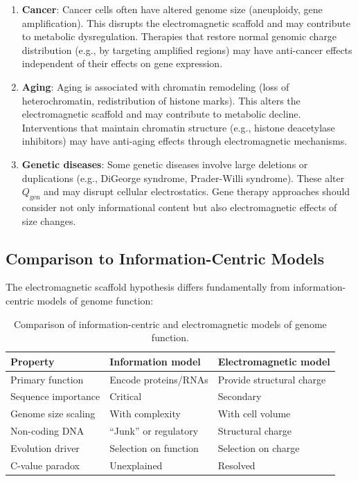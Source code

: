 \documentclass[twocolumn,10pt,aps,prd,superscriptaddress,floatfix,nofootinbib]{revtex4-2}
\theoremstyle{remark}
\begin{document}
\begin{enumerate}
\item \textbf{Cancer}: Cancer cells often have altered genome size (aneuploidy, gene amplification). This disrupts the electromagnetic scaffold and may contribute to metabolic dysregulation. Therapies that restore normal genomic charge distribution (e.g., by targeting amplified regions) may have anti-cancer effects independent of their effects on gene expression.

\item \textbf{Aging}: Aging is associated with chromatin remodeling (loss of heterochromatin, redistribution of histone marks). This alters the electromagnetic scaffold and may contribute to metabolic decline. Interventions that maintain chromatin structure (e.g., histone deacetylase inhibitors) may have anti-aging effects through electromagnetic mechanisms.

\item \textbf{Genetic diseases}: Some genetic diseases involve large deletions or duplications (e.g., DiGeorge syndrome, Prader-Willi syndrome). These alter $Q_{\mathrm{gen}}$ and may disrupt cellular electrostatics. Gene therapy approaches should consider not only informational content but also electromagnetic effects of size changes.
\end{enumerate}

\subsection{Comparison to Information-Centric Models}

The electromagnetic scaffold hypothesis differs fundamentally from information-centric models of genome function:

\begin{table}[h]
\centering
\begin{tabular}{lll}
\hline
Property & Information model & Electromagnetic model \\
\hline
Primary function & Encode proteins/RNAs & Provide structural charge \\
Sequence importance & Critical & Secondary \\
Genome size scaling & With complexity & With cell volume \\
Non-coding DNA & ``Junk'' or regulatory & Structural charge \\
Evolution driver & Selection on function & Selection on charge \\
C-value paradox & Unexplained & Resolved \\
\hline
\end{tabular}
\caption{Comparison of information-centric and electromagnetic models of genome function.}
\label{tab:genome_models}
\end{table}
\end{document}
